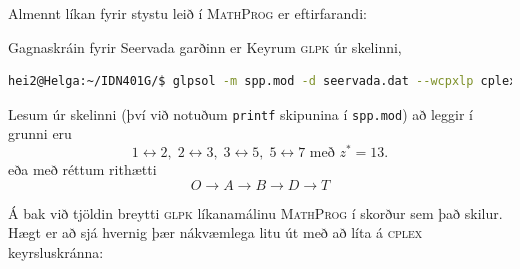 \newpage
\begin{lausnSYND}\mbox{Almennt} líkan fyrir stystu leið í \textsc{MathProg} er eftirfarandi:

Gagnaskráin fyrir Seervada garðinn er 
\label{seervada.dat}
Keyrum \textsc{glpk} úr skelinni, 
\begin{lstlisting}[language=bash]
hei2@Helga:~/IDN401G/$ glpsol -m spp.mod -d seervada.dat --wcpxlp cplex.skra  
\end{lstlisting}
Lesum úr skelinni (því við notuðum \texttt{printf} skipunina í \texttt{spp.mod}) að leggir í grunni eru 
$$1\leftrightarrow2,\; 2\leftrightarrow3,\; 3\leftrightarrow5,\; 5\leftrightarrow7 \mbox{ með } z^*=13.$$ 
eða með réttum rithætti
$$O\rightarrow A \rightarrow B \rightarrow D \rightarrow T$$ 

Á bak við tjöldin breytti \textsc{glpk} líkanamálinu \textsc{MathProg} í skorður sem það skilur. Hægt er að sjá hvernig þær nákvæmlega litu út með að líta á \textsc{cplex} keyrsluskránna:

\end{lausnSYND}


